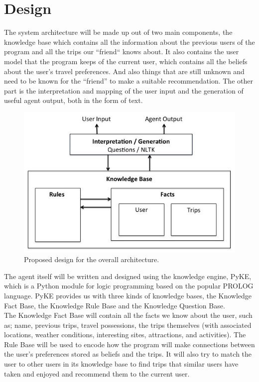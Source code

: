 \documentclass[11pt]{article} %
\begin{document}
\section{Design}
The system architecture will be made up out of two main components, the knowledge base which contains all the information about the previous users of the program and all the trips our “friend“ knows about. It also contains the user model that the program keeps of the current user, which contains all the beliefs about the user’s travel preferences. And also things that are still unknown and need to be known for the “friend” to make a suitable recommendation. The other part is the interpretation and mapping of the user input and the generation of useful agent output, both in the form of text.
\begin{figure}[H]
\centering
\includegraphics[width=12cm]{architecture.jpg}
\caption{Proposed design for the overall architecture.}
\end{figure}
The agent itself will be written and designed using the knowledge engine, PyKE, which is a Python module for logic programming based on the popular PROLOG language.
PyKE provides us with three kinds of knowledge bases, the Knowledge Fact Base, the Knowledge Rule Base and the Knowledge Question Base.\\
The Knowledge Fact Base will contain all the facts we know about the user, such as; name, previous trips, travel possessions, the trips themselves (with associated locations, weather conditions, interesting sites, attractions, and activities).
The Rule Base will be used to encode how the program will make connections between the user’s preferences stored as beliefs and the trips. It will also try to match the user to other users in its knowledge base to find trips that similar users have taken and enjoyed and recommend them to the current user.\\
\end{document}
